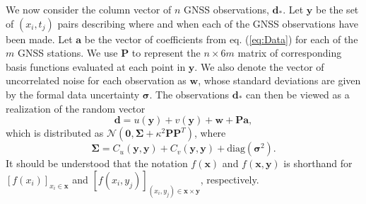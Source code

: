 \documentclass[10pt,a4paper]{article}
\begin{document}
We now consider the column vector of $n$ GNSS observations, $\bm{d}_*$. Let $\bm{y}$ be the set of $(x_i, t_j)$ pairs describing where and when each of the GNSS observations have been made. Let $\bm{a}$ be the vector of coefficients from eq. (\ref{eq:Data}) for each of the $m$ GNSS stations. We use $\bm{P}$ to represent the $n \times 6m$ matrix of corresponding basis functions evaluated at each point in $\bm{y}$. We  also denote the vector of uncorrelated noise for each observation as $\bm{w}$, whose standard deviations are given by the formal data uncertainty $\bm{\sigma}$. The observations $\bm{d}_*$ can then be viewed as a realization of the random vector
\begin{equation}
\bm{d} = u(\bm{y}) + v(\bm{y}) + \bm{w} + \bm{P}\bm{a},
\end{equation}
which is distributed as $\mathcal{N}(\bm{0},\bm{\Sigma} + \kappa^2\bm{P}\bm{P}^T)$, where
\begin{equation}\label{eq:Cd}
\bm{\Sigma} = C_u(\bm{y},\bm{y}) + C_v(\bm{y},\bm{y}) + 
              \mathrm{diag}\left(\bm{\sigma}^2\right).  
\end{equation}
It should be understood that the notation $f(\bm{x})$ and $f(\bm{x},\bm{y})$ is shorthand for $[f(x_i)]_{x_i \in \bm{x}}$ and $[f(x_i,y_j)]_{(x_i,y_j) \in \bm{x} \times \bm{y}}$, respectively. 
\end{document}

